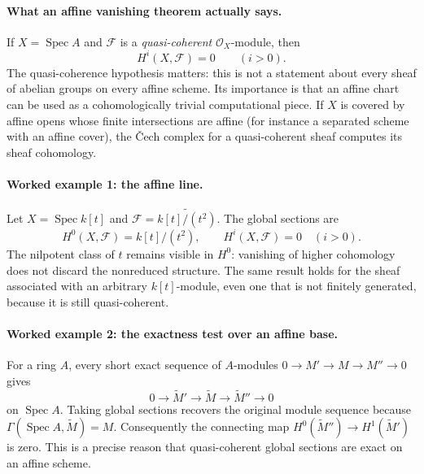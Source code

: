 \paragraph{What an affine vanishing theorem actually says.}
If $X=\operatorname{Spec}A$ and $\mathcal F$ is a
\emph{quasi-coherent} $\mathcal O_X$-module, then
\[
H^i(X,\mathcal F)=0\qquad(i>0).
\]
The quasi-coherence hypothesis matters: this is not a
statement about every sheaf of abelian groups on every
affine scheme.  Its importance is that an affine chart
can be used as a cohomologically trivial computational
piece.  If $X$ is covered by affine opens whose finite
intersections are affine (for instance a separated
scheme with an affine cover), the \v{C}ech complex for a
quasi-coherent sheaf computes its sheaf cohomology.

\paragraph{Worked example 1: the affine line.}
Let $X=\operatorname{Spec}k[t]$ and
$\mathcal F=\widetilde{k[t]/(t^2)}$.  The global sections are
\[
H^0(X,\mathcal F)=k[t]/(t^2),
\qquad H^i(X,\mathcal F)=0\quad(i>0).
\]
The nilpotent class of $t$ remains visible in $H^0$:
vanishing of higher cohomology does not discard the
nonreduced structure.  The same result holds for the
sheaf associated with an arbitrary $k[t]$-module, even
one that is not finitely generated, because it is still
quasi-coherent.

\paragraph{Worked example 2: the exactness test over an affine base.}
For a ring $A$, every short exact sequence of
$A$-modules
$0\to M'\to M\to M''\to0$ gives
\[
0\to\widetilde M'\to\widetilde M\to
 \widetilde M''\to0
\]
on $\operatorname{Spec}A$.  Taking global sections
recovers the original module sequence because
$\Gamma(\operatorname{Spec}A,\widetilde M)=M$.
Consequently the connecting map
$H^0(\widetilde M'')\to H^1(\widetilde M')$ is zero.
This is a precise reason that quasi-coherent global
sections are exact on an affine scheme.


